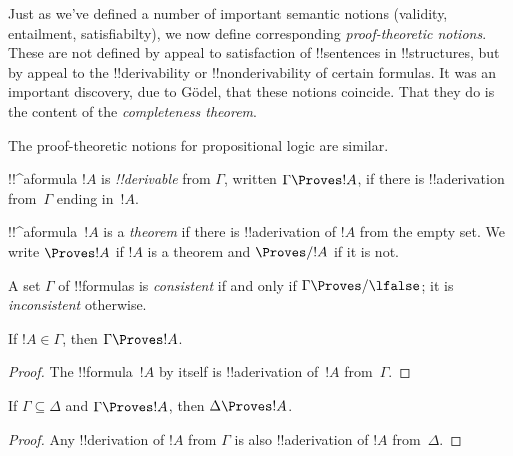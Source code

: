 \documentclass[../../include/open-logic-section]{subfiles}
\begin{document}

\begin{explain}
Just as we've defined a number of important semantic notions
(validity, entailment, satisfiabilty), we now define corresponding
\emph{proof-theoretic notions}.  These are not defined by appeal to
satisfaction of !!{sentence}s in !!{structure}s, but by appeal to the
!!{derivability} or !!{nonderivability} of certain formulas.  It was
an important discovery, due to G\"odel, that these notions coincide.
That they do is the content of the \emph{completeness theorem}.

The proof-theoretic notions for propositional logic are similar.
\end{explain}

\begin{defn}[!!^{derivability}]
!!^a{formula} $!A$ is \emph{!!{derivable}} from $\Gamma$, written
$\Gamma \Proves !A$, if there is !!a{derivation} from~$\Gamma$ ending
in~$!A$.
\end{defn}

\begin{defn}[Theorems]
!!^a{formula}~$!A$ is a \emph{theorem} if there is !!a{derivation} of
$!A$ from the empty set.  We write $\Proves !A$ if $!A$ is a theorem
and $\Proves/ !A$ if it is not.
\end{defn}

\begin{defn}[Consistency]
A set $\Gamma$ of !!{formula}s is \emph{consistent} if and only if
$\Gamma\Proves/ \lfalse$; it is \emph{inconsistent} otherwise.
\end{defn}

\begin{prop}[Reflexivity]
If $!A \in \Gamma$, then $\Gamma \Proves !A$.
\end{prop}

\begin{proof}
  The !!{formula}~$!A$ by itself is !!a{derivation} of~$!A$ from~$\Gamma$.
\end{proof}

\begin{prop}[Monotony]
If $\Gamma \subseteq \Delta$ and $\Gamma \Proves !A$, then $\Delta
\Proves !A$.
\end{prop}

\begin{proof}
Any !!{derivation} of $!A$ from $\Gamma$ is also !!a{derivation} of
$!A$ from~$\Delta$.
\end{proof}
\end{document}
